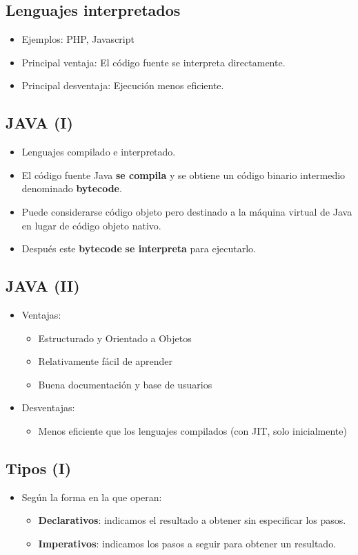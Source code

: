 \documentclass[a4paper]{article}
\begin{document}
\subsection{Lenguajes interpretados}
\label{lenguajes-interpretados}
\begin{itemize}
\item Ejemplos: PHP, Javascript
\item Principal ventaja: El código fuente se interpreta directamente.
\item Principal desventaja: Ejecución menos eficiente.
\end{itemize}
\subsection{JAVA (I)}
\label{java-i}
\begin{itemize}
\item Lenguajes compilado e interpretado.
\item El código fuente Java \textbf{se compila} y se obtiene un código binario
intermedio denominado \textbf{bytecode}.
\item Puede considerarse código objeto pero destinado a la máquina virtual
de Java en lugar de código objeto nativo.
\item Después este \textbf{bytecode} \textbf{se interpreta} para ejecutarlo.
\end{itemize}
\subsection{JAVA (II)}
\label{java-ii}
\begin{itemize}
\item Ventajas:
\begin{itemize}
\item Estructurado y Orientado a Objetos
\item Relativamente fácil de aprender
\item Buena documentación y base de usuarios
\end{itemize}
\item Desventajas:
\begin{itemize}
\item Menos eficiente que los lenguajes compilados (con JIT, solo inicialmente)
\end{itemize}
\end{itemize}
\subsection{Tipos (I)}
\label{tipos-i}
\begin{itemize}
\item Según la forma en la que operan:
\begin{itemize}
\item \textbf{Declarativos}: indicamos el resultado a obtener sin especificar los
pasos.
\item \textbf{Imperativos}: indicamos los pasos a seguir para obtener un
resultado.
\end{itemize}
\end{itemize}
\end{document}
